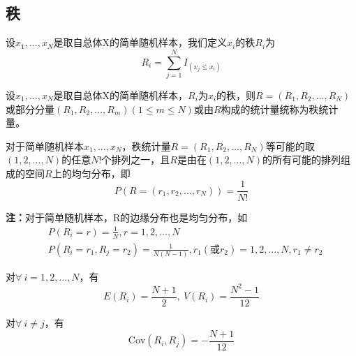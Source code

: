 \documentclass[lang=cn,10pt]{elegantbook}
\begin{document}
\subsection{秩}
\begin{definition}
    设$x_1,...,x_{N}$是取自总体X的简单随机样本，我们定义$x_{i}$的秩$R_i$为
    \begin{equation}
        R_i = \sum_{j=1}^{N}I_{(x_{j}\leq{x_{i}})}
    \end{equation}
\end{definition}

\begin{definition}
    设$x_1,...,x_{N}$是取自总体X的简单随机样本，$R_i$为$x_i$的秩，则$R = (R_1,R_2,...,R_N)$或部分分量$(R_1,R_2,...,R_m)(1\leq m \leq N)$或由$R$构成的统计量统称为秩统计量。
\end{definition}

\begin{proposition}
    对于简单随机样本$x_1,...,x_{N}$，秩统计量$R = (R_1,R_2,...,R_N)$等可能的取$(1,2,...,N)$的任意$N!$个排列之一，且$R$是由在$(1,2,...,N)$的所有可能的排列组成的空间$R$上的均匀分布，即
    \begin{equation}
        P(R = (r_1,r_2,...,r_N)) = \frac{1}{N!}
    \end{equation}
\end{proposition}
\textbf{注：}对于简单随机样本，R的边缘分布也是均匀分布，如
\begin{equation}
    \begin{aligned}
         & P(R_i = r) = \frac1N, r = 1,2,...,N                                            \\
         & P(R_i=r_1,R_j=r_2) = \frac1{N(N-1)}, r_1(\text{或}r_2) = 1,2,...,N, r_1\neq r_2
    \end{aligned}
\end{equation}

\begin{theorem}
    对$\forall~i = 1,2,...,N$，有
    \begin{equation}
        E(R_i)=\frac{N+1}2,~V(R_i)=\frac{N^2 -1}{12}
    \end{equation}
\end{theorem}

\begin{theorem}
    对$\forall~i \neq j$，有
    \begin{equation}
        \mathrm{Cov}(R_i,R_j) = -\frac{N+1}{12}
    \end{equation}
\end{theorem}
\end{document}
